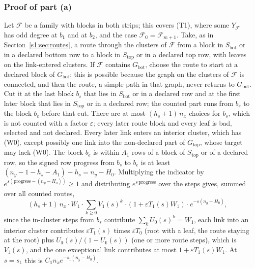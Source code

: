 \documentclass[11pt]{amsart}
\theoremstyle{definition}
\theoremstyle{remark}
\numberwithin{equation}{section}
\newcommand{\cF}{\mathcal{F}}
\newcommand{\eps}{\varepsilon}
\newcommand{\Gbot}{G_{\mathrm{bot}}}
\newcommand{\Gtop}{G_{\mathrm{top}}}
\newcommand{\Sbot}{S_{\mathrm{bot}}}
\newcommand{\Stop}{S_{\mathrm{top}}}
\begin{document}
\subsubsection{Proof of part (a)}
Let $\cF$ be a family with blocks in both strips; this covers (T1), where some $Y_\cF$ has odd degree at $b_1$ and at $b_2$, and the case $\cF_0=\cF_{m+1}$. Take, as in Section~\ref{s1:sec:routes}, a route through the clusters of $\cF$ from a block in $\Sbot$ or in a declared bottom row to a block in $\Stop$ or in a declared top row, with leaves on the link-entered clusters. If $\cF$ contains $\Gbot$, choose the route to start at a declared block of $\Gbot$; this is possible because the graph on the clusters of $\cF$ is connected, and then the route, a simple path in that graph, never returns to $\Gbot$. Cut it at the last block $b_s$ that lies in $\Sbot$ or in a declared row and at the first later block that lies in $\Stop$ or in a declared row; the counted part runs from $b_s$ to the block $b_e$ before that cut. There are at most $(h_s+1)\,n_x$ choices for $b_s$, which is not counted with a factor $\eps$; every later route block and every leaf is bad, selected and not declared. Every later link enters an interior cluster, which has (W0), except possibly one link into the non-declared part of $\Gtop$, whose target may lack (W0). The block $b_e$ is within $A_1$ rows of a block of $\Stop$ or of a declared row, so the signed row progress from $b_s$ to $b_e$ is at least $(n_y-1-h_s-A_1)-h_s=n_y-H_0$. Multiplying the indicator by $e^{s(\text{progress}-(n_y-H_0))}\ge1$ and distributing $e^{s\,\text{progress}}$ over the steps gives, summed over all counted routes,
\[
(h_s+1)\,n_x\cdot W_1\cdot\sum_{k\ge0}V_1(s)^k\cdot(1+\eps T_1(s)W_1)\cdot e^{-s(n_y-H_0)},
\]
since the in-cluster steps from $b_s$ contribute $\sum_kU_0(s)^k=W_1$, each link into an interior cluster contributes $\eps T_1(s)$ times $\eps T_0$ (root with a leaf, the route staying at the root) plus $U_0(s)/(1-U_0(s))$ (one or more route steps), which is $V_1(s)$, and the one exceptional link contributes at most $1+\eps T_1(s)W_1$. At $s=s_1$ this is $C_1n_xe^{-s_1(n_y-H_0)}$.
\end{document}
